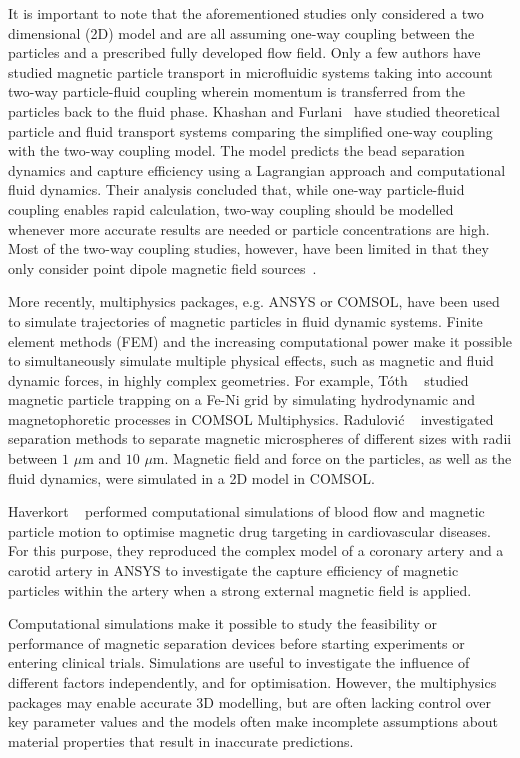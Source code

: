It is important to note that the aforementioned studies only considered a two dimensional (2D) model and are all assuming one-way coupling between the particles and a prescribed fully developed flow field. Only a few authors have studied magnetic particle transport in microfluidic systems taking into account two-way particle-fluid coupling wherein momentum is transferred from the particles back to the fluid phase. Khashan and Furlani~\cite{Khashan2012,Khashan2013} have studied theoretical particle and fluid transport systems comparing the simplified one-way coupling with the two-way coupling model. The model predicts the bead separation dynamics and capture efficiency using a Lagrangian approach and computational fluid dynamics. Their analysis concluded that, while one-way particle-fluid coupling enables rapid calculation, two-way coupling should be modelled whenever more accurate results are needed or particle concentrations are high. Most of the two-way coupling studies, however, have been limited in that they only consider point dipole magnetic field sources~\cite{Modak2009,Modak2010,Furlani2012}.

More recently, multiphysics packages, e.g. ANSYS or COMSOL, have been used to simulate trajectories of magnetic particles in fluid dynamic systems. Finite element methods (FEM) and the increasing computational power make it possible to simultaneously simulate multiple physical effects, such as magnetic and fluid dynamic forces, in highly complex geometries. For example, T\'{o}th \etal{}~\cite{Toth2016} studied magnetic particle trapping on a Fe-Ni grid by simulating hydrodynamic and magnetophoretic processes in COMSOL Multiphysics. Radulovi\'{c} \etal{}~\cite{Radulovic2015} investigated separation methods to separate magnetic microspheres of different sizes with radii between $1$ $\mu$m and $10$ $\mu$m. Magnetic field and force on the particles, as well as the fluid dynamics, were simulated in a 2D model in COMSOL.

Haverkort \etal{}~\cite{Haverkort2009} performed computational simulations of blood flow and magnetic particle motion to optimise magnetic drug targeting in cardiovascular diseases. For this purpose, they reproduced the complex model of a coronary artery and a carotid artery in ANSYS to investigate the capture efficiency of magnetic particles within the artery when a strong external magnetic field is applied.

Computational simulations make it possible to study the feasibility or performance of magnetic separation devices before starting experiments or entering clinical trials. Simulations are useful to investigate the influence of different factors independently, and for optimisation. However, the multiphysics packages may enable accurate 3D modelling, but are often lacking control over key parameter values and the models often make incomplete assumptions about material properties that result in inaccurate predictions.

